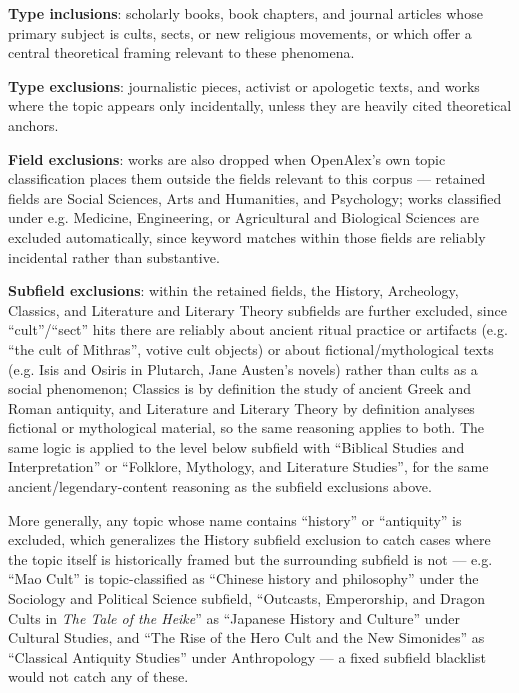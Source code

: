 \textbf{Type inclusions}: scholarly books, book chapters, and journal articles whose primary subject is cults, sects, or new religious movements, or which offer a central theoretical framing relevant to these phenomena.

\textbf{Type exclusions}: journalistic pieces, activist or apologetic texts, and works where the topic appears only incidentally, unless they are heavily cited theoretical anchors.

\textbf{Field exclusions}: works are also dropped when OpenAlex's own topic classification places them outside the fields relevant to this corpus — retained fields are Social Sciences, Arts and Humanities, and Psychology; works classified under e.g. Medicine, Engineering, or Agricultural and Biological Sciences are excluded automatically, since keyword matches within those fields are reliably incidental rather than substantive.

\textbf{Subfield exclusions}: within the retained fields, the History, Archeology, Classics, and Literature and Literary Theory subfields are further excluded, since \enquote{cult}/\enquote{sect} hits there are reliably about ancient ritual practice or artifacts (e.g. \enquote{the cult of Mithras}, votive cult objects) or about fictional/mythological texts (e.g. Isis and Osiris in Plutarch, Jane Austen's novels) rather than cults as a social phenomenon; Classics is by definition the study of ancient Greek and Roman antiquity, and Literature and Literary Theory by definition analyses fictional or mythological material, so the same reasoning applies to both. The same logic is applied to the level below subfield with \enquote{Biblical Studies and Interpretation} or \enquote{Folklore, Mythology, and Literature Studies}, for the same ancient/legendary-content reasoning as the subfield exclusions above.

More generally, any topic whose name contains \enquote{history} or \enquote{antiquity} is excluded, which generalizes the History subfield exclusion to catch cases where the topic itself is historically framed but the surrounding subfield is not — e.g. \enquote{Mao Cult} is topic-classified as \enquote{Chinese history and philosophy} under the Sociology and Political Science subfield, \enquote{Outcasts, Emperorship, and Dragon Cults in \textit{The Tale of the Heike}} as \enquote{Japanese History and Culture} under Cultural Studies, and \enquote{The Rise of the Hero Cult and the New Simonides} as \enquote{Classical Antiquity Studies} under Anthropology — a fixed subfield blacklist would not catch any of these.

